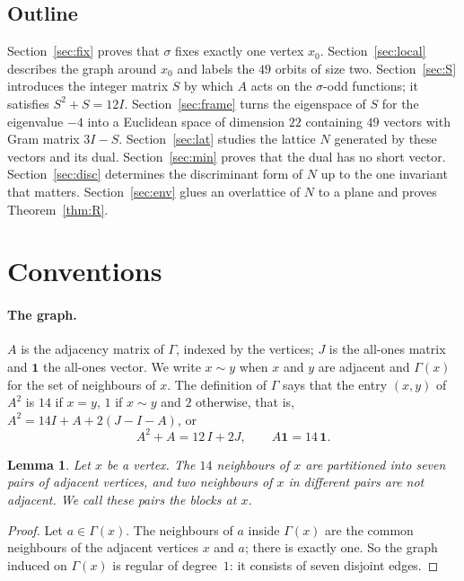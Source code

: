 \documentclass[11pt,a4paper]{article}
\newtheorem{lemma}[theorem]{Lemma}
\theoremstyle{definition}
\theoremstyle{remark}
\newcommand{\one}{\mathbf{1}}
\newcommand{\sg}{\sigma}
\newcommand{\Nb}{\Gamma}
\begin{document}
\subsection{Outline}
Section~\ref{sec:fix} proves that $\sg$ fixes exactly one vertex $x_0$. Section~\ref{sec:local} describes the graph
around $x_0$ and labels the $49$ orbits of size two. Section~\ref{sec:S} introduces the integer matrix $S$ by which $A$
acts on the $\sg$-odd functions; it satisfies $S^2+S=12I$. Section~\ref{sec:frame} turns the eigenspace of $S$ for the
eigenvalue $-4$ into a Euclidean space of dimension $22$ containing $49$ vectors with Gram matrix $3I-S$.
Section~\ref{sec:lat} studies the lattice $N$ generated by these vectors and its dual. Section~\ref{sec:min} proves
that the dual has no short vector. Section~\ref{sec:disc} determines the discriminant form of $N$ up to the one
invariant that matters. Section~\ref{sec:env} glues an overlattice of $N$ to a plane and proves
Theorem~\ref{thm:R}.

\section{Conventions}\label{sec:conv}

\paragraph{The graph.} $A$ is the adjacency matrix of $\Gamma$, indexed by the vertices; $J$ is the all-ones matrix
and $\one$ the all-ones vector. We write $x\sim y$ when $x$ and $y$ are adjacent and $\Nb(x)$ for the set of
neighbours of $x$. The definition of $\Gamma$ says that the entry $(x,y)$ of $A^2$ is $14$ if $x=y$, $1$ if
$x\sim y$ and $2$ otherwise, that is, $A^2=14I+A+2(J-I-A)$, or
\begin{equation}\label{eq:srg}
A^2+A=12\,I+2J ,\qquad A\one=14\,\one .
\end{equation}

\begin{lemma}\label{lem:blocks}
Let $x$ be a vertex. The $14$ neighbours of $x$ are partitioned into seven pairs of adjacent vertices, and two
neighbours of $x$ in different pairs are not adjacent. We call these pairs the \emph{blocks at $x$}.
\end{lemma}
\begin{proof}
Let $a\in\Nb(x)$. The neighbours of $a$ inside $\Nb(x)$ are the common neighbours of the adjacent vertices $x$ and
$a$; there is exactly one. So the graph induced on $\Nb(x)$ is regular of degree~$1$: it consists of seven disjoint
edges.
\end{proof}
\end{document}
